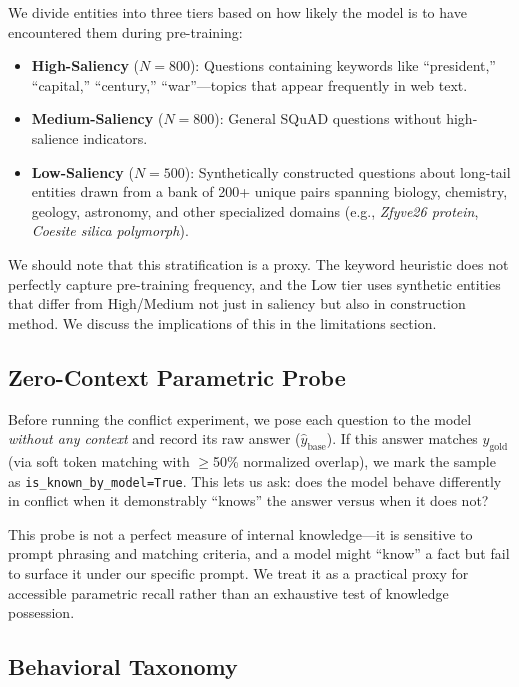 \documentclass[11pt, letterpaper]{article}
\begin{document}
We divide entities into three tiers based on how likely the model is to have encountered them during pre-training:

\begin{itemize}[nosep]
    \item \textbf{High-Saliency} ($N=800$): Questions containing keywords like ``president,'' ``capital,'' ``century,'' ``war''---topics that appear frequently in web text.
    \item \textbf{Medium-Saliency} ($N=800$): General SQuAD questions without high-salience indicators.
    \item \textbf{Low-Saliency} ($N=500$): Synthetically constructed questions about long-tail entities drawn from a bank of 200+ unique pairs spanning biology, chemistry, geology, astronomy, and other specialized domains (e.g., \textit{Zfyve26 protein}, \textit{Coesite silica polymorph}).
\end{itemize}

We should note that this stratification is a proxy. The keyword heuristic does not perfectly capture pre-training frequency, and the Low tier uses synthetic entities that differ from High/Medium not just in saliency but also in construction method. We discuss the implications of this in the limitations section.

\subsection*{Zero-Context Parametric Probe}

Before running the conflict experiment, we pose each question to the model \textit{without any context} and record its raw answer ($\hat{y}_\text{base}$). If this answer matches $y_\text{gold}$ (via soft token matching with $\geq$50\% normalized overlap), we mark the sample as \texttt{is\_known\_by\_model=True}. This lets us ask: does the model behave differently in conflict when it demonstrably ``knows'' the answer versus when it does not?

This probe is not a perfect measure of internal knowledge---it is sensitive to prompt phrasing and matching criteria, and a model might ``know'' a fact but fail to surface it under our specific prompt. We treat it as a practical proxy for accessible parametric recall rather than an exhaustive test of knowledge possession.

\subsection*{Behavioral Taxonomy}
\end{document}
